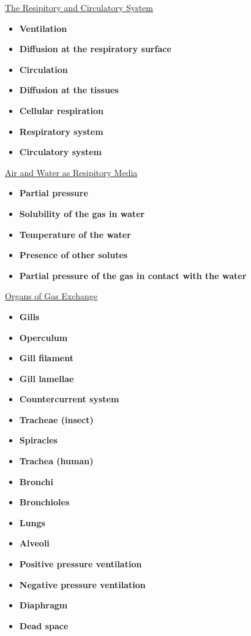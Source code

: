 \documentclass[12pt,letterpaper]{article}
\begin{document}
\hypertarget{42.1}{}
\begin{secbox}{\hyperlink{42}{The Resipitory and Circulatory System}}{
    \begin{itemize}
        \item \textbf{Ventilation}
        \item \textbf{Diffusion at the respiratory surface}
        \item \textbf{Circulation}
        \item \textbf{Diffusion at the tissues}
        \item \textbf{Cellular respiration}
        \item \textbf{Respiratory system}
        \item \textbf{Circulatory system}
    \end{itemize}
}\end{secbox}

\hypertarget{42.2}{}
\begin{secbox}{\hyperlink{42}{Air and Water as Resipitory Media}}{
    \begin{itemize}
        \item \textbf{Partial pressure}
        \item \textbf{Solubility of the gas in water}
        \item \textbf{Temperature of the water}
        \item \textbf{Presence of other solutes}
        \item \textbf{Partial pressure of the gas in contact with the water}
    \end{itemize}
}\end{secbox}

\hypertarget{42.3}{}
\begin{secbox}{\hyperlink{42}{Organs of Gas Exchange}}{
    \begin{itemize}
        \item \textbf{Gills}
        \item \textbf{Operculum}
        \item \textbf{Gill filament}
        \item \textbf{Gill lamellae}
        \item \textbf{Countercurrent system}
        \item \textbf{Tracheae (insect)}
        \item \textbf{Spiracles}
        \item \textbf{Trachea (human)}
        \item \textbf{Bronchi }
        \item \textbf{Bronchioles}
        \item \textbf{Lungs}
        \item \textbf{Alveoli}
        \item \textbf{Positive pressure ventilation}
        \item \textbf{Negative pressure ventilation}
        \item \textbf{Diaphragm}
        \item \textbf{Dead space}
    \end{itemize}
}\end{secbox}
\end{document}
